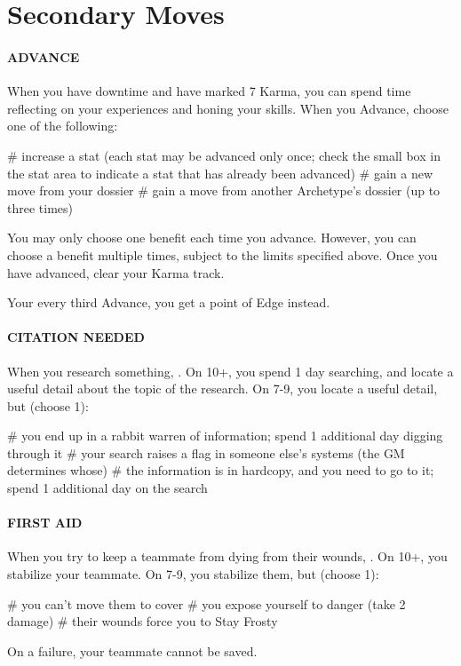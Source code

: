 \section{Secondary Moves}

\paragraph{ADVANCE}
When you have downtime and have marked 7 Karma, you can spend time reflecting on your experiences and honing your skills. When you Advance, choose one of the following:
\begin{easylist}
    # increase a stat (each stat may be advanced only once; check the small box in the stat area to indicate a stat that has already been advanced)
    # gain a new move from your dossier
    # gain a move from another Archetype’s dossier (up to three times)
\end{easylist}
You may only choose one benefit each time you advance. However, you can choose a benefit multiple times, subject to the limits specified above. Once you have advanced, clear your Karma track.

Your every third Advance, you get a point of Edge instead.


\paragraph{CITATION NEEDED}
When you research something, . On 10+, you spend 1 day searching, and locate a useful detail about the topic of the research. On 7-9, you locate a useful detail, but (choose 1):

\begin{easylist}
    # you end up in a rabbit warren of information; spend 1 additional day digging through it
    # your search raises a flag in someone else’s systems (the GM determines whose)
    # the information is in hardcopy, and you need to go to it; spend 1 additional day on the search
\end{easylist}

\paragraph{FIRST AID}
When you try to keep a teammate from dying from their wounds, . On 10+, you stabilize your teammate. On 7-9, you stabilize them, but (choose 1):
\begin{easylist}
    # you can’t move them to cover
    # you expose yourself to danger (take 2 damage)
    # their wounds force you to Stay Frosty
\end{easylist}
On a failure, your teammate cannot be saved.

